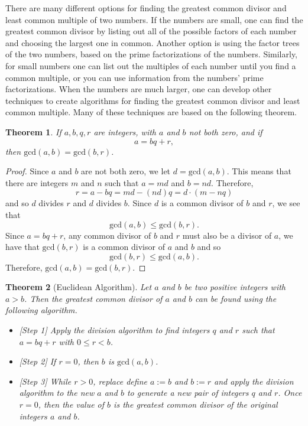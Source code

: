 \documentclass[
]{book}
\providecommand{\tightlist}{%
  \setlength{\itemsep}{0pt}\setlength{\parskip}{0pt}}
\newtheorem{theorem}{Theorem}[chapter]
\theoremstyle{definition}
\theoremstyle{definition}
\theoremstyle{definition}
\theoremstyle{remark}
\begin{document}
There are many different options for finding the greatest common divisor and least common multiple of two numbers. If the numbers are small, one can find the greatest common divisor by listing out all of the possible factors of each number and choosing the largest one in common. Another option is using the factor trees of the two numbers, based on the prime factorizations of the numbers. Similarly, for small numbers one can list out the multiples of each number until you find a common multiple, or you can use information from the numbers' prime factorizations. When the numbers are much larger, one can develop other techniques to create algorithms for finding the greatest common divisor and least common multiple. Many of these techniques are based on the following theorem.

\begin{theorem}
\protect\hypertarget{thm:integers-division-gcd}{}{\label{thm:integers-division-gcd} }If \(a,b,q,r\) are integers, with \(a\) and \(b\) not both zero, and if \[a=bq+r,\] then \(\mathrm{gcd}(a,b)=\mathrm{gcd}(b,r)\).
\end{theorem}

\begin{proof}
{}Since \(a\) and \(b\) are not both zero, we let \(d=\mathrm{gcd}(a,b)\). This means that there are integers \(m\) and \(n\) such that \(a=md\) and \(b=nd\). Therefore,
\[r=a-bq=md-(nd)q = d\cdot (m-nq)\] and so \(d\) divides \(r\) and \(d\) divides \(b\). Since \(d\) is a common divisor of \(b\) and \(r\), we see that \[\mathrm{gcd}(a,b)\leq \mathrm{gcd}(b,r).\] Since \(a=bq+r\), any common divisor of \(b\) and \(r\) must also be a divisor of \(a\), we have that \(\mathrm{gcd}(b,r)\) is a common divisor of \(a\) and \(b\) and so \[\mathrm{gcd}(b,r) \leq \mathrm{gcd}(a,b).\] Therefore, \(\mathrm{gcd}(a,b)=\mathrm{gcd}(b,r)\).
\end{proof}

\begin{theorem}[Euclidean Algorithm]
\protect\hypertarget{thm:unnamed-chunk-182}{}{\label{thm:unnamed-chunk-182} {} }Let \(a\) and \(b\) be two positive integers with \(a>b\). Then the greatest common divisor of \(a\) and \(b\) can be found using the following algorithm.

\begin{itemize}
\tightlist
\item
  {[}Step 1{]} Apply the division algorithm to find integers \(q\) and \(r\) such that \(a=bq+r\) with \(0\leq r<b\).
\item
  {[}Step 2{]} If \(r=0\), then \(b\) is \(\mathrm{gcd}(a,b)\).
\item
  {[}Step 3{]} While \(r>0\), replace define \(a:=b\) and \(b:=r\) and apply the division algorithm to the new \(a\) and \(b\) to generate a new pair of integers \(q\) and \(r\). Once \(r=0\), then the value of \(b\) is the greatest common divisor of the original integers \(a\) and \(b\).
\end{itemize}
\end{theorem}
\end{document}
